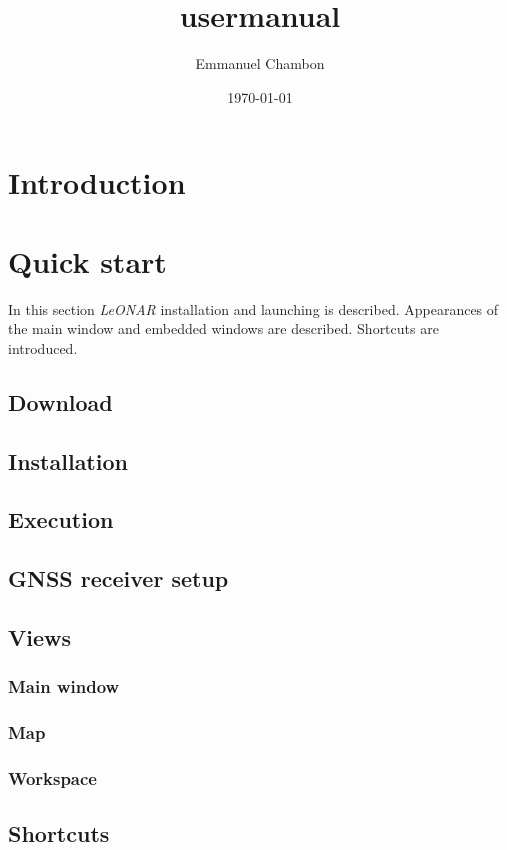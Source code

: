 \documentclass[12pt]{article}
\title{\appname{} \appversion{} usermanual}
\author{Emmanuel Chambon}
\date{\today}
\newcommand{\appname}{\textit{LeONAR}}
\begin{document}
\maketitle{}

\tableofcontents

\clearpage
\newpage


\section{Introduction}


\section{Quick start}
In this section \appname{} installation and launching is described. Appearances of the main window and embedded windows are described. Shortcuts are introduced.
\subsection{Download}
\subsection{Installation}
\subsection{Execution}
\subsection{GNSS receiver setup}
\subsection{Views}
\subsubsection{Main window}
\subsubsection{Map}
\subsubsection{Workspace}
\subsection{Shortcuts}
\end{document}
